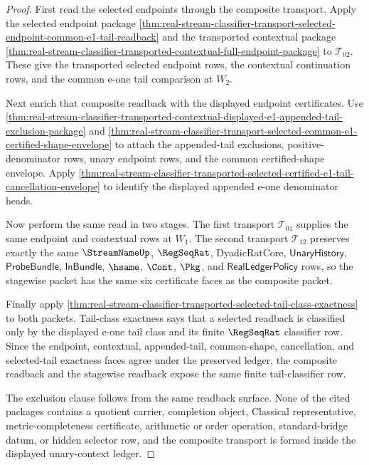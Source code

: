\begin{proof}
First read the selected endpoints through the composite transport. Apply the
selected endpoint package
\autoref{thm:real-stream-classifier-transport-selected-endpoint-common-e1-tail-readback}
and the transported contextual package
\autoref{thm:real-stream-classifier-transported-contextual-full-endpoint-package}
to $\mathcal{T}_{02}$. These give the transported selected endpoint rows, the
contextual continuation rows, and the common e-one tail comparison at $W_2$.

Next enrich that composite readback with the displayed endpoint certificates.
Use
\autoref{thm:real-stream-classifier-transported-contextual-displayed-e1-appended-tail-exclusion-package}
and
\autoref{thm:real-stream-classifier-transport-selected-common-e1-certified-shape-envelope}
to attach the appended-tail exclusions, positive-denominator rows, unary
endpoint rows, and the common certified-shape envelope. Apply
\autoref{thm:real-stream-classifier-transported-selected-certified-e1-tail-cancellation-envelope}
to identify the displayed appended e-one denominator heads.

Now perform the same read in two stages. The first transport
$\mathcal{T}_{01}$ supplies the same endpoint and contextual rows at $W_1$.
The second transport $\mathcal{T}_{12}$ preserves exactly the same
$\StreamNameUp$, $\RegSeqRat$, DyadicRatCore, $\mathsf{UnaryHistory}$,
$\mathsf{ProbeBundle}$, $\mathsf{InBundle}$, $\hsame$, $\Cont$, $\Pkg$, and
$\mathsf{RealLedgerPolicy}$ rows, so the stagewise packet has the same six
certificate faces as the composite packet.

Finally apply
\autoref{thm:real-stream-classifier-transported-selected-tail-class-exactness}
to both packets. Tail-class exactness says that a selected readback is
classified only by the displayed e-one tail class and its finite
$\RegSeqRat$ classifier row. Since the endpoint, contextual, appended-tail,
common-shape, cancellation, and selected-tail exactness faces agree under the
preserved ledger, the composite readback and the stagewise readback expose the
same finite tail-classifier row.

The exclusion clause follows from the same readback surface. None of the cited
packages contains a quotient carrier, completion object, Classical
representative, metric-completeness certificate, arithmetic or order
operation, standard-bridge datum, or hidden selector row, and the composite
transport is formed inside the displayed unary-context ledger.
\end{proof}

